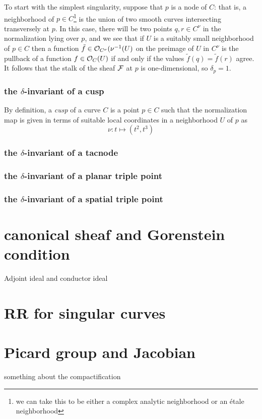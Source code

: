 To start with the simplest singularity, suppose that $p$ is a node of $C$: that is, a neighborhood of $p \in C$\footnote{we can take this to be either a complex analytic neighborhood or an \'etale neighborhood} is the union of two smooth curves intersecting transversely at $p$. In this case, there will be two points $q, r \in C^\nu$ in the normalization lying over $p$, and we see that if $U$ is a suitably small neighborhood of $p \in C$ then a function $\tilde f \in {\mathcal O}_{C^\nu}(\nu^{-1}(U)$ on the preimage of $U$ in $C^\nu$  is the pullback of a function $f \in {\mathcal O}_C(U)$ if and only if the values $\tilde f(q) = \tilde f(r)$ agree. It follows that the stalk of the sheaf ${\mathcal F}$ at $p$ is one-dimensional, so $\delta_p = 1$.

\subsubsection{the $\delta$-invariant of a cusp}

By definition, a \emph{cusp} of a curve $C$ is a point $p \in C$ such that the normalization map is given in terms of suitable local coordinates in a neighborhood $U$ of $p$ as
$$
\nu : t \mapsto (t^2, t^3)
$$

\subsubsection{the $\delta$-invariant of a tacnode}



\subsubsection{the $\delta$-invariant of a planar triple point}



\subsubsection{the $\delta$-invariant of a spatial triple point}

\section{canonical sheaf and Gorenstein condition}
Adjoint ideal and conductor ideal

\section{RR for singular curves}

\section{Picard group and Jacobian}
\begin{fact}
 something about the compactification
\end{fact}

